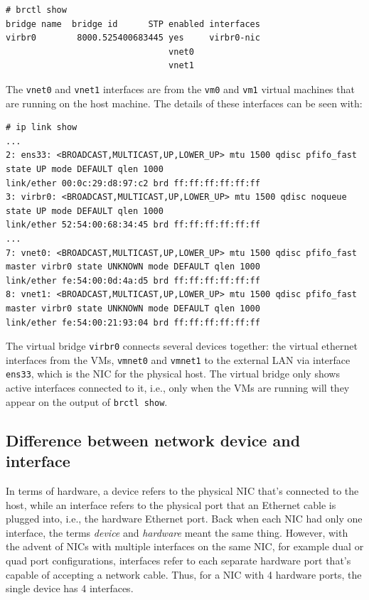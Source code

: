 \vspace{-20pt}
\begin{verbatim}
# brctl show
bridge name	 bridge id		STP enabled	interfaces
virbr0	      8000.525400683445	yes		virbr0-nic
								vnet0
								vnet1
\end{verbatim}
\vspace{-10pt}	

\noindent
The \verb|vnet0| and \verb|vnet1| interfaces are from the \verb|vm0| and \verb|vm1| virtual machines that are running on the host machine. The details of these interfaces can be seen with:

\vspace{-15pt}
\begin{verbatim}
# ip link show
...
2: ens33: <BROADCAST,MULTICAST,UP,LOWER_UP> mtu 1500 qdisc pfifo_fast state UP mode DEFAULT qlen 1000
link/ether 00:0c:29:d8:97:c2 brd ff:ff:ff:ff:ff:ff
3: virbr0: <BROADCAST,MULTICAST,UP,LOWER_UP> mtu 1500 qdisc noqueue state UP mode DEFAULT qlen 1000
link/ether 52:54:00:68:34:45 brd ff:ff:ff:ff:ff:ff
...
7: vnet0: <BROADCAST,MULTICAST,UP,LOWER_UP> mtu 1500 qdisc pfifo_fast master virbr0 state UNKNOWN mode DEFAULT qlen 1000
link/ether fe:54:00:0d:4a:d5 brd ff:ff:ff:ff:ff:ff
8: vnet1: <BROADCAST,MULTICAST,UP,LOWER_UP> mtu 1500 qdisc pfifo_fast master virbr0 state UNKNOWN mode DEFAULT qlen 1000
link/ether fe:54:00:21:93:04 brd ff:ff:ff:ff:ff:ff
\end{verbatim}
\vspace{-10pt}	

\noindent
The virtual bridge \verb|virbr0| connects several devices together: the virtual ethernet interfaces from the VMs, \verb|vmnet0| and \verb|vmnet1| to the external LAN via interface \verb|ens33|, which is the NIC for the physical host. The virtual bridge only shows active interfaces connected to it, i.e., only when the VMs are running will they appear on the output of \verb|brctl show|. 

\subsection{Difference between network device and interface}
In terms of hardware, a device refers to the physical NIC that's connected to the host, while an interface refers to the physical port that an Ethernet cable is plugged into, i.e., the hardware Ethernet port. Back when each NIC had only one interface, the terms \textit{device} and \textit{hardware} meant the same thing. However, with the advent of NICs with multiple interfaces on the same NIC, for example dual or quad port configurations, interfaces refer to each separate hardware port that's capable of accepting a network cable. Thus, for a NIC with 4 hardware ports, the single device has 4 interfaces. 

